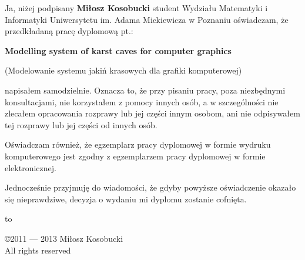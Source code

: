 \documentclass[twoside,openright,a4paper,12pt]{memoir}
\theoremstyle{definition}
\begin{document}
Ja, niżej podpisany \textbf{Miłosz Kosobucki} student Wydziału
Matematyki i Informatyki Uniwersytetu im. Adama Mickiewicza w Poznaniu
oświadczam, że przedkładaną pracę dyplomową pt.:

\textbf{Modelling system of karst caves for computer graphics}

(Modelowanie systemu jakiń krasowych dla grafiki komputerowej)

napisałem samodzielnie. Oznacza to, że przy pisaniu pracy, poza niezbędnymi
konsultacjami, nie korzystałem z pomocy innych osób, a w szczególności nie
zlecałem opracowania rozprawy lub jej części innym osobom, ani nie
odpisywałem tej rozprawy lub jej części od innych osób.

Oświadczam również, że egzemplarz pracy dyplomowej w formie wydruku
komputerowego jest zgodny z egzemplarzem pracy dyplomowej w formie
elektronicznej.

Jednocześnie przyjmuję do wiadomości, że gdyby powyższe oświadczenie
okazało się nieprawdziwe, decyzja o wydaniu mi dyplomu zostanie cofnięta.

\newcommand{\kropki}[2]{%
  \vbox{%
    \hbox to #1{\dotfill}%
    \vspace{4pt}%
    \hbox to #1{\hss #2\hss}%
  }
}
\vspace{1cm}
\hbox to \textwidth{%
  \hfil
  \kropki{4cm}{data}%
  \hfil\hfil
  \kropki{4cm}{podpis}%
  \hfil
}%
\newpage

\begingroup
\footnotesize
\setlength{\parindent}{0pt}
\setlength{\parskip}{\baselineskip}
\newpage\null\thispagestyle{empty}\newpage
\copyright 2011 --- 2013 Miłosz Kosobucki \\
All rights reserved
\endgroup

\tableofcontents









\printbibliography
\end{document}
